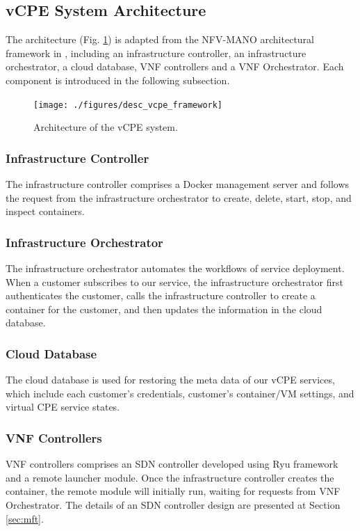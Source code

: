 \documentclass[conference]{IEEEtran}
\begin{document}
\subsection{vCPE System Architecture}
The architecture (Fig. \ref{fig:desc_vcpe_framework}) is adapted from the NFV-MANO architectural framework in \cite{nfv2014-v111}, including an infrastructure controller, an infrastructure orchestrator, a cloud database, VNF controllers and a VNF Orchestrator. Each component is introduced in the following subsection.

\begin{figure}[!t]
\centering
\texttt{[image: ./figures/desc\_vcpe\_framework]}
\caption{Architecture of the vCPE system.}
\label{fig:desc_vcpe_framework}
\end{figure}

\subsubsection{Infrastructure Controller}

The infrastructure controller comprises a Docker management server and follows the request from the infrastructure orchestrator to create, delete, start, stop, and inspect containers.

\subsubsection{Infrastructure Orchestrator}

The infrastructure orchestrator automates the workflows of service deployment. When a customer subscribes to our service, the infrastructure orchestrator first authenticates the customer, calls the infrastructure controller to create a container for the customer, and then updates the information in the cloud database.

\subsubsection{Cloud Database}
The cloud database is used for restoring the meta data of our vCPE services, which include each customer’s credentials, customer's container/VM settings, and virtual CPE service states.

\subsubsection{VNF Controllers}
VNF controllers comprises an SDN controller developed using Ryu framework \cite{web:ryu} and a remote launcher module. Once the infrastructure controller creates the container, the remote module will initially run, waiting for requests from VNF Orchestrator. The details of an SDN controller design are presented at Section \ref{sec:mft}.
\end{document}
